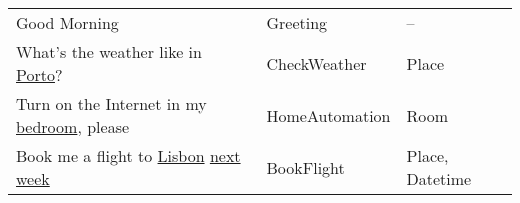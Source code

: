 \begin{tabular}{l*{2}{|l}}
%
\toprule
%
&&\\
%
\midrule
%
{Good Morning}&{Greeting}&{--}\\
%
{What's the weather like in \underline{Porto}?}&{CheckWeather}&{Place}\\
%
{Turn on the Internet in my \underline{bedroom}, please}&{HomeAutomation}&{Room}\\
%
{Book me a flight to \underline{Lisbon} \underline{next week}}&{BookFlight}&{Place, Datetime}\\
%
\bottomrule
%
\end{tabular}